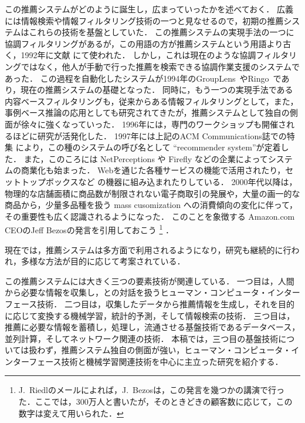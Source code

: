 この推薦システムがどのように誕生し，広まっていったかを述べておく．
広義には情報検索や情報フィルタリング技術の一つと見なせるので，初期の推薦システムはこれらの技術を基盤としていた．
この推薦システムの実現手法の一つに協調フィルタリングがあるが，この用語の方が推薦システムという用語より古く，1992年に文献 \cite{macm:92:01} にて使われた．
しかし，これは現在のような協調フィルタリングではなく，他人が手動で行った推薦を検索できる協調作業支援のシステムであった．
この過程を自動化したシステムが1994年のGroupLens~\cite{cscw:94:01}やRingo~\cite{sigchi:95:02}であり，現在の推薦システムの基礎となった．
同時に，もう一つの実現手法である内容ベースフィルタリングも，従来からある情報フィルタリングとして，また，事例ベース推論の応用としても研究されてきたが，推薦システムとして独自の側面が徐々に強くなっていった．
1996年には，専門のワークショップも開催されるほどに研究が活発化した．
1997年には上記のACM Communications誌での特集\cite{macm:97:01} により，この種のシステムの呼び名として ``recommender system''が定着した．
また，このころには NetPerceptions や Firefly などの企業によってシステムの商業化も始まった．
Webを通じた各種サービスの機能で活用されたり\cite{ieeem:99:02,ieeem:03:01,www:07:01}，セットトップボックスなど
の機器に組み込まれたり\cite{kdd:04:11}している．
2000年代以降は，物理的な店舗面積に商品数が制限されない電子商取引の発展や，大量の画一的な商品から，少量多品種を扱う mass cusomization への消費傾向の変化に伴って，その重要性も広く認識されるようになった．
このことを象徴する Amazon.com CEOのJeff Bezosの発言を引用しておこう\cite{dmkd:01:01}%
\footnote{J.~Riedlのメールによれば，J.~Bezosは，この発言を幾つかの講演で行った．ここでは，300万人と書いたが，そのときどきの顧客数に応じて，この数字は変えて用いられた．} ．
\begin{center}
\setlength{\fboxsep}{1zw}
\end{center}
現在では，推薦システムは多方面で利用されるようになり，研究も継続的に行われ，多様な方法が目的に応じて考案されている．

この推薦システムには大きく三つの要素技術が関連している．
一つ目は，人間から必要な情報を収集し，との対話を扱うヒューマン・コンピュータ・インターフェース技術．
二つ目は，収集したデータから推薦情報を生成し，それを目的に応じて変換する機械学習，統計的予測，そして情報検索の技術．
三つ目は，推薦に必要な情報を蓄積し，処理し，流通させる基盤技術であるデータベース，並列計算，そしてネットワーク関連の技術．
本稿では，三つ目の基盤技術については扱わず，推薦システム独自の側面が強い，ヒューマン・コンピュータ・インターフェース技術と機械学習関連技術を中心に主立った研究を紹介する．
